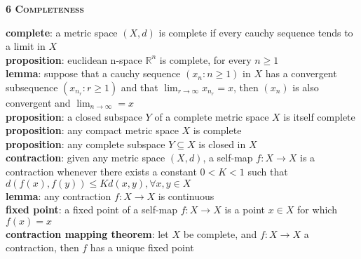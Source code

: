 \documentclass[a4paper]{article}
\begin{document}
\begin{framed}
	\begin{center}
		\textbf{\textsc{6 Completeness}}
	\end{center}
	\textbf{complete}: a metric space $(X, d)$ is complete if every cauchy sequence tends to a limit in $X$\\
	
	\noindent
	\textbf{proposition}: euclidean n-space $\mathbb{R}^n$ is complete, for every $n \geq 1$\\
	
	\noindent
	\textbf{lemma}: suppose that a cauchy sequence $(x_n : n \geq 1)$ in $X$ has a convergent subsequence $(x_{n_r} : r \geq 1)$ and that $\lim_{r \rightarrow \infty} x_{n_r} = x$,  then $(x_n)$ is also convergent and $\lim_{n \rightarrow \infty} = x$\\
	
	\noindent
	\textbf{proposition}: a closed subspace $Y$ of a complete metric space $X$ is itself complete\\
	
	\noindent
	\textbf{proposition}: any compact metric space $X$ is complete\\
	
	\noindent
	\textbf{proposition}: any complete subspace $Y \subseteq X$ is closed in $X$\\
	
	\noindent
	\textbf{contraction}: given any metric space $(X, d)$, a self-map $f: X \rightarrow X$ is a contraction whenever there exists a constant $0 < K < 1$ such that $d(f(x), f(y)) \leq Kd(x, y), \forall x, y \in X$\\
	
	\noindent
	\textbf{lemma}: any contraction $f: X \rightarrow X$ is continuous\\
	
	\noindent
	\textbf{fixed point}: a fixed point of a self-map $f: X \rightarrow X$ is a point $x \in X$ for which $f(x) = x$\\
	
	\noindent
	\textbf{contraction mapping theorem}: let $X$ be complete, and $f: X \rightarrow X$ a contraction, then $f$ has a unique fixed point
\end{framed}
\end{document}
